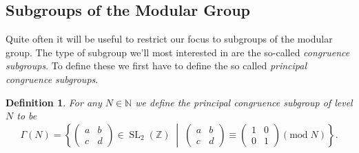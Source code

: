 \documentclass[a4paper]{article}
\theoremstyle{theoremdd}
\theoremstyle{definitiondd}
\newtheorem{definition}[theorem]{Definition}
\theoremstyle{remarkdd}
\newcommand{\N}{\mathbb{N}}
\newcommand{\Z}{\mathbb{Z}}
\newcommand{\bigset}[2]{ \left\{ #1 \;\middle|\; #2 \right\} }
\DeclareMathOperator{\SL}{SL}
\begin{document}
\subsection{Subgroups of the Modular Group}
Quite often it will be useful to restrict our focus to subgroups of the modular group. 
The type of subgroup we'll most interested in are the so-called \emph{congruence subgroups}.
To define these we first have to define the so called \emph{principal congruence subgroups}.  
\begin{definition}
	For any $N \in \N$ we define the \emph{principal congruence subgroup of level $N$} to be \[
		\Gamma(N) = \bigset{\begin{pmatrix} a & b \\ c & d \end{pmatrix} \in \SL_2(\Z)}{\begin{pmatrix} a & b \\ c & d \end{pmatrix}  \equiv \begin{pmatrix} 1 & 0 \\ 0 & 1 \end{pmatrix}  (\mathrm{mod}\; N)}
	.\] 
\end{definition}
\end{document}
